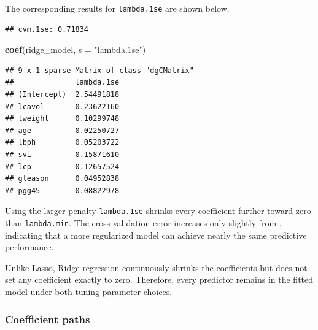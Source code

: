 \documentclass[
  11pt,
]{article}
\newenvironment{Shaded}{\begin{snugshade}}{\end{snugshade}}
\newcommand{\AttributeTok}[1]{\textcolor[rgb]{0.13,0.29,0.53}{#1}}
\newcommand{\FloatTok}[1]{\textcolor[rgb]{0.00,0.00,0.81}{#1}}
\newcommand{\FunctionTok}[1]{\textcolor[rgb]{0.13,0.29,0.53}{\textbf{#1}}}
\newcommand{\NormalTok}[1]{#1}
\newcommand{\OtherTok}[1]{\textcolor[rgb]{0.56,0.35,0.01}{#1}}
\newcommand{\SpecialCharTok}[1]{\textcolor[rgb]{0.81,0.36,0.00}{\textbf{#1}}}
\newcommand{\StringTok}[1]{\textcolor[rgb]{0.31,0.60,0.02}{#1}}
\begin{document}
The corresponding results for \texttt{lambda.1se} are shown below.

\begin{Shaded}
\end{Shaded}

\begin{verbatim}
## cvm.1se: 0.71834
\end{verbatim}

\begin{Shaded}
\begin{Highlighting}[]
\FunctionTok{coef}\NormalTok{(ridge\_model, }\AttributeTok{s =} \StringTok{"lambda.1se"}\NormalTok{)}
\end{Highlighting}
\end{Shaded}

\begin{verbatim}
## 9 x 1 sparse Matrix of class "dgCMatrix"
##              lambda.1se
## (Intercept)  2.54491818
## lcavol       0.23622160
## lweight      0.10299748
## age         -0.02250727
## lbph         0.05203722
## svi          0.15871610
## lcp          0.12657524
## gleason      0.04952838
## pgg45        0.08822978
\end{verbatim}

Using the larger penalty \texttt{lambda.1se} shrinks every coefficient
further toward zero than \texttt{lambda.min}. The cross-validation error
increases only slightly from , indicating that a more regularized model
can achieve nearly the same predictive performance.

Unlike Lasso, Ridge regression continuously shrinks the coefficients but
does not set any coefficient exactly to zero. Therefore, every predictor
remains in the fitted model under both tuning parameter choices.

\subsubsection{Coefficient paths}\label{coefficient-paths}
\end{document}
